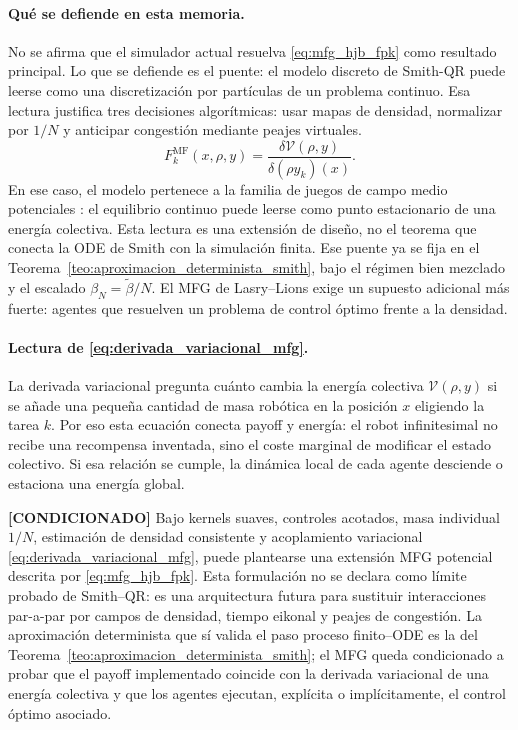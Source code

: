 \paragraph{Qué se defiende en esta memoria.}
No se afirma que el simulador actual resuelva \eqref{eq:mfg_hjb_fpk} como resultado
principal. Lo que se defiende es el puente: el modelo discreto de Smith-QR puede leerse
como una discretización por partículas de un problema continuo. Esa lectura justifica
tres decisiones algorítmicas: usar mapas de densidad, normalizar por $1/N$ y anticipar
congestión mediante peajes virtuales.
\begin{equation}
  F_k^{\mathrm{MF}}(x,\rho,y)
  =
  \frac{\delta\mathcal V(\rho,y)}
       {\delta(\rho y_k)(x)} .
  \label{eq:derivada_variacional_mfg}
\end{equation}
En ese caso, el modelo pertenece a la familia de juegos de campo medio potenciales
\citep{lasry2007mfg,huang2006large}: el equilibrio continuo puede leerse como punto
estacionario de una energía colectiva. Esta lectura es una extensión de diseño, no el
teorema que conecta la ODE de Smith con la simulación finita. Ese puente ya se fija en el
Teorema~\ref{teo:aproximacion_determinista_smith}, bajo el régimen bien mezclado y el
escalado $\beta_N=\tilde\beta/N$. El MFG de Lasry--Lions exige un supuesto adicional más
fuerte: agentes que resuelven un problema de control óptimo frente a la densidad.

\paragraph{Lectura de \eqref{eq:derivada_variacional_mfg}.}
La derivada variacional pregunta cuánto cambia la energía colectiva
$\mathcal V(\rho,y)$ si se añade una pequeña cantidad de masa robótica en la posición
$x$ eligiendo la tarea $k$. Por eso esta ecuación conecta payoff y energía: el robot
infinitesimal no recibe una recompensa inventada, sino el coste marginal de modificar el
estado colectivo. Si esa relación se cumple, la dinámica local de cada agente desciende
o estaciona una energía global.

\begin{observacion} \textbf{[CONDICIONADO]}
\label{obs:puente_mfg}
Bajo kernels suaves, controles acotados, masa individual $1/N$, estimación de densidad
consistente y acoplamiento variacional \eqref{eq:derivada_variacional_mfg}, puede
plantearse una extensión MFG potencial descrita por \eqref{eq:mfg_hjb_fpk}. Esta
formulación no se declara como límite probado de Smith--QR: es una arquitectura futura
para sustituir interacciones par-a-par por campos de densidad, tiempo eikonal y peajes de
congestión. La aproximación determinista que sí valida el paso proceso finito--ODE es la
del Teorema~\ref{teo:aproximacion_determinista_smith}; el MFG queda condicionado a probar
que el payoff implementado coincide con la derivada variacional de una energía colectiva
y que los agentes ejecutan, explícita o implícitamente, el control óptimo asociado.
\end{observacion}

